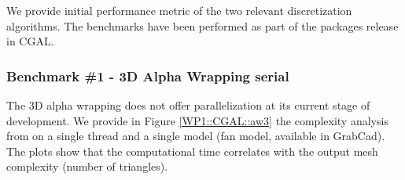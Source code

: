 We provide initial performance metric of the two relevant discretization algorithms.
The benchmarks have been performed as part of the packages release in CGAL.



\subsubsection{Benchmark \#1 - 3D Alpha Wrapping serial}


The 3D alpha wrapping does not offer parallelization at its current stage of development.
We provide in Figure \ref{WP1::CGAL::aw3} the complexity analysis from \cite{portaneri_alpha_2022} 
on a single thread and a single model (fan model, available in GrabCad). The plots show 
that the computational time correlates with the output mesh complexity (number of triangles).



